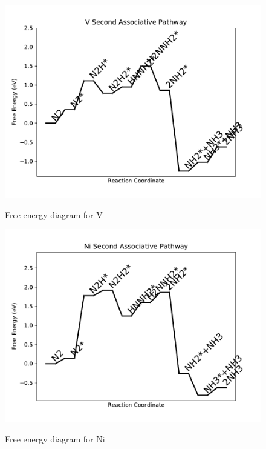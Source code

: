 \documentclass{article}
\begin{document}
\clearpage
\begin{figure}
\includegraphics[width=1\linewidth]{data/plots/V_associative_2.pdf}
\label{fig:V_associative_2}
\caption{Free energy diagram for V}
\end{figure}

\begin{figure}
\includegraphics[width=1\linewidth]{data/plots/Ni_associative_2.pdf}
\label{fig:Ni_associative_2}
\caption{Free energy diagram for Ni}
\end{figure}
\end{document}
